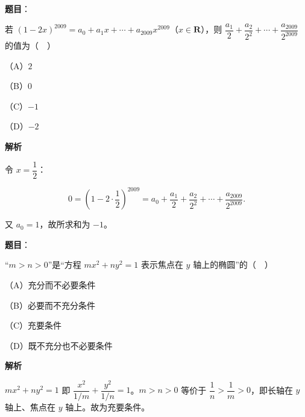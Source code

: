 \begin{answer}

\textbf{题目}：

若 $(1-2x)^{2009}=a_0+a_1x+\cdots+a_{2009}x^{2009}$（$x\in\mathbf R$），则 $\dfrac{a_1}2+\dfrac{a_2}{2^2}+\cdots+\dfrac{a_{2009}}{2^{2009}}$ 的值为（　）

（A）$2$

（B）$0$

（C）$-1$

（D）$-2$

\textbf{解析}

令 $x=\dfrac12$：

\nopagebreak[4]
\[0=\left(1-2\cdot\frac12\right)^{2009}
=a_0+\frac{a_1}2+\frac{a_2}{2^2}+\cdots+\frac{a_{2009}}{2^{2009}}.\]

又 $a_0=1$，故所求和为 $-1$。


\end{answer}
\begin{answer}

\textbf{题目}：

“$m>n>0$”是“方程 $mx^2+ny^2=1$ 表示焦点在 $y$ 轴上的椭圆”的（　）

（A）充分而不必要条件

（B）必要而不充分条件

（C）充要条件

（D）既不充分也不必要条件

\textbf{解析}

$mx^2+ny^2=1$ 即 $\dfrac{x^2}{1/m}+\dfrac{y^2}{1/n}=1$。$m>n>0$ 等价于 $\dfrac1n>\dfrac1m>0$，即长轴在 $y$ 轴上、焦点在 $y$ 轴上。故为充要条件。


\end{answer}
